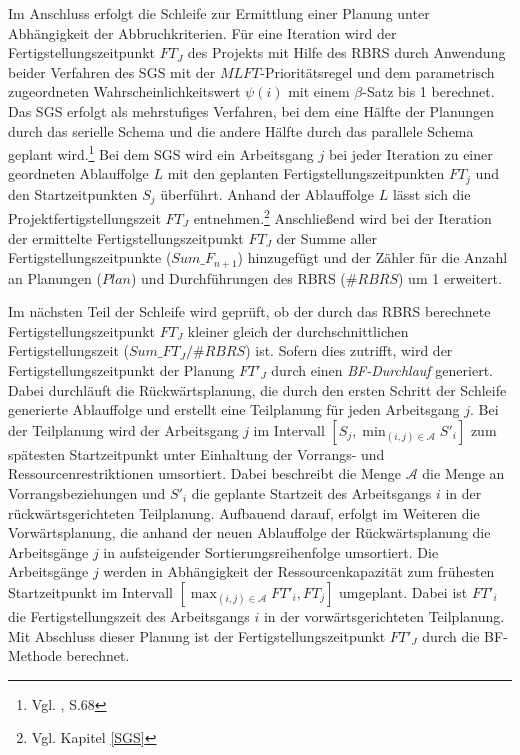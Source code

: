 \documentclass[a4paper,12pt,normalheadings,footexclude,headinclude,liststotoc,nochapterprefix,onecolumn,oneside,parskip,pointlessnumbers]{scrreprt}
\begin{document}
Im Anschluss erfolgt die Schleife zur Ermittlung einer Planung unter Abhängigkeit der Abbruchkriterien. Für eine Iteration wird der Fertigstellungszeitpunkt $FT_{J}$ des Projekts mit Hilfe des RBRS durch Anwendung beider Verfahren des SGS mit der $MLFT$-Prio\-ri\-täts\-regel und dem parametrisch zugeordneten Wahrscheinlichkeitswert $\psi(i)$ mit einem $\beta$-Satz bis 1 berechnet. Das SGS erfolgt als mehrstufiges Verfahren, bei dem eine Hälfte der Planungen durch das serielle Schema und die andere Hälfte durch das parallele Schema geplant wird.\footnote{Vgl. \cite{tormos2001competitive}, S.68}
Bei dem SGS wird ein Arbeitsgang $j$ bei jeder Iteration zu einer geordneten Ablauffolge $L$ mit den geplanten Fertigstellungszeitpunkten $FT_{j}$ und den Startzeitpunkten $S_{j}$ überführt. Anhand der Ablauffolge $L$ lässt sich die Projektfertigstellungszeit $FT_{J}$ entnehmen.\footnote{Vgl. Kapitel \ref{SGS}} Anschließend wird bei der Iteration der ermittelte Fertigstellungszeitpunkt $FT_{J}$ der Summe aller Fertigstellungszeitpunkte ($Sum\_F_{n+1}$) hinzugefügt und der Zähler für die Anzahl an Planungen ($Plan$) und Durchführungen des RBRS ($\#RBRS$) um 1 erweitert.

Im nächsten Teil der Schleife wird geprüft, ob der durch das RBRS berechnete Fertigstellungszeitpunkt $FT_{J}$ kleiner gleich der durchschnittlichen Fertigstellungszeit ($Sum\_FT_{J}/\#RBRS$) ist. Sofern dies zutrifft, wird der Fertigstellungszeitpunkt der Planung $FT'_{J}$ durch einen \textit{BF-Durch\-lauf} generiert. Dabei durchläuft die Rückwärtsplanung, die durch den ersten Schritt der Schleife generierte Ablauffolge und erstellt eine Teilplanung für jeden Arbeitsgang $j$. Bei der Teilplanung wird der Arbeitsgang $j$ im Intervall $[S_{j},\min_{(i, j) \in \mathcal{A}}S'_{i}]$ zum spätesten Startzeitpunkt unter Einhaltung der Vorrangs- und Ressourcenrestriktionen umsortiert. Dabei beschreibt die Menge $\mathcal{A}$ die Menge an Vorrangsbeziehungen und $S'_{i}$ die geplante Startzeit des Arbeitsgangs $i$ in der rückwärtsgerichteten Teilplanung. Aufbauend darauf, erfolgt im Weiteren die Vorwärtsplanung, die anhand der neuen Ablauffolge der Rückwärtsplanung die Arbeitsgänge $j$ in aufsteigender Sortierungsreihenfolge umsortiert. Die Arbeitsgänge $j$ werden in Abhängigkeit der Ressourcenkapazität zum frühesten Startzeitpunkt im Intervall $[\max_{(i,j) \in \mathcal{A}}FT'_{i},FT_{j}]$ umgeplant. Dabei ist $FT'_{i}$ die Fertigstellungszeit des Arbeitsgangs $i$ in der vorwärtsgerichteten Teilplanung. Mit Abschluss dieser Planung ist der Fertigstellungszeitpunkt $FT'_{J}$ durch die BF-Methode berechnet.
\end{document}
